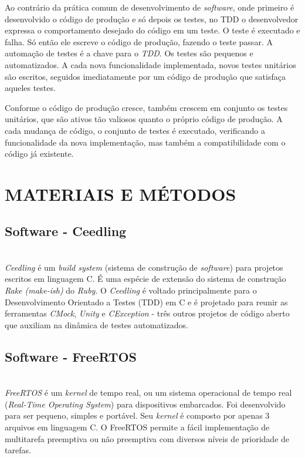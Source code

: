 \documentclass[times, twoside, watermark]{artigo}
\begin{document}
Ao contrário da prática comum de desenvolvimento de \textit{software}, onde primeiro é desenvolvido o código de produção e só depois os testes, no TDD
o desenvolvedor expressa o comportamento desejado do código em um teste. 
O teste é executado e falha. Só então ele escreve o código de produção, fazendo o teste passar.
A automação de testes é a chave para o \textit{TDD}. Os testes são pequenos e automatizados.
A cada nova funcionalidade implementada, novos testes unitários são escritos, 
seguidos imediatamente por um código de produção que satisfaça aqueles testes. 

Conforme o código de produção cresce, também crescem em conjunto os testes unitários, 
que são ativos tão valiosos quanto o próprio código de produção. A cada mudança de código, o conjunto de testes é executado, verificando a funcionalidade da nova implementação, mas também a compatibilidade com o código já existente. \cite{tddembeddedc}



\section*{MATERIAIS E MÉTODOS}
\setcounter{section}{-1}

\subsection{Software - Ceedling}\hfill\\
\textit{Ceedling} é um \textit{build system} (sistema de construção de \textit{software}) para projetos escritos em linguagem C.
É uma espécie de extensão do sistema de construção \textit{Rake (make-ish)} do \textit{Ruby}.
O \textit{Ceedling} é voltado principalmente para o Desenvolvimento Orientado a Testes (TDD) em C e é projetado para reunir as ferramentas \textit{CMock},
\textit{Unity} e \textit{CException} - três outros projetos de código aberto que auxiliam na dinâmica de testes automatizados. \cite{gomes2016uttos}


\subsection{Software - FreeRTOS}\hfill\\
\textit{FreeRTOS} é um \textit{kernel} de tempo real, ou um sistema operacional de tempo real (\textit{Real-Time Operating System}) 
para dispositivos embarcados. Foi desenvolvido para ser pequeno, simples e portável. 
Seu \textit{kernel} é composto por apenas 3 arquivos em linguagem C. 
O FreeRTOS permite a fácil implementação de multitarefa preemptiva ou não preemptiva com diversos níveis de prioridade de tarefas.\cite{zhu2016understanding}
\end{document}

